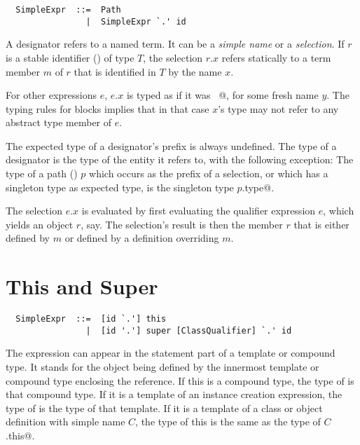 \syntax\begin{lstlisting}
  SimpleExpr  ::=  Path
                |  SimpleExpr `.' id
\end{lstlisting}

A designator refers to a named term. It can be a {\em simple name} or
a {\em selection}. If $r$ is a stable identifier
() of type $T$, the selection $r.x$ refers
statically to a term member $m$ of $r$ that is identified in $T$ by
the name $x$.   

For other expressions $e$, $e.x$ is typed as
if it was ~@, for some fresh name
$y$.  The typing rules for blocks implies that in that case $x$'s type
may not refer to any abstract type member of $e$.

The expected type of a designator's prefix is always undefined.  The
type of a designator is the type of the entity it refers to, with the
following exception: The type of a path () $p$ which
occurs as the prefix of a selection, or which has a singleton type as
expected type, is the singleton type \lstinline@$p$.type@.

The selection $e.x$ is evaluated by first evaluating the qualifier
expression $e$, which yields an object $r$, say. The selection's
result is then the member $r$ that is either defined by $m$ or defined
by a definition overriding $m$.

\section{This and Super}
\label{sec:this-super}

\syntax\begin{lstlisting}
  SimpleExpr  ::=  [id `.'] this
                |  [id '.'] super [ClassQualifier] `.' id
\end{lstlisting}

The expression  can appear in the statement part of a
template or compound type. It stands for the object being defined by
the innermost template or compound type enclosing the reference. If
this is a compound type, the type of  is that compound type.
If it is a template of an instance creation expression, the type of
 is the type of that template. If it is a template of a
class or object definition with simple name $C$, the type of this
is the same as the type of \lstinline@$C$.this@.


